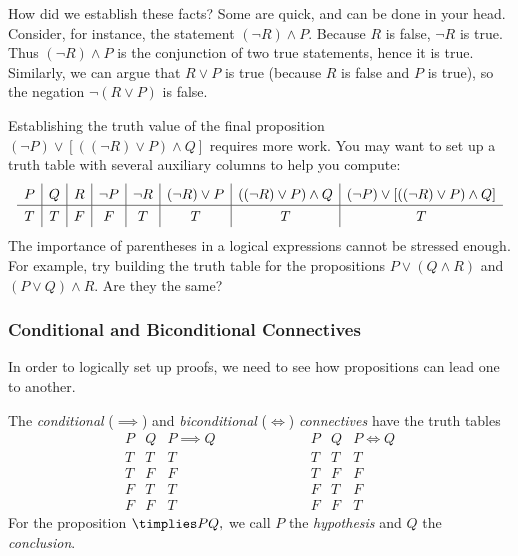\noindent How did we establish these facts? Some  are quick,  and can be done in your head. Consider, for instance, the statement  $(\neg R)\wedge P$. Because $R$ is false, $\neg R$ is true. Thus $(\neg R)\wedge P$ is the conjunction of two true statements, hence it is true. Similarly, we can argue that $R\vee P$ is true (because $R$ is false and $P$ is true), so the negation $\neg(R\vee P)$ is false.

\noindent  Establishing the truth value of the final proposition $(\neg P)\vee [((\neg R)\vee P) \wedge Q]$ requires more work. You may want to set up a truth table with several auxiliary columns to help you compute: 
\[\def\arraystretch{1.3}
\begin{array}{c|c|c|c|c|c|c|c}
P & Q & R & \neg P & \neg R & (\neg R) \vee P & ((\neg R)\vee P) \wedge Q &  (\neg P) \vee [ ((\neg R)\vee P) \wedge Q] \\\hline
 T & T & F & F            & T         & T                        & T                                               & T
 \end{array}\]
The importance of parentheses in a logical expressions cannot be stressed enough. For example, try building the truth table for the propositions $P\vee(Q\wedge R)$ and $(P\vee Q)\wedge R$. Are they the same?\pagebreak[4]


\subsubsection*{Conditional and Biconditional Connectives}

In order to logically set up proofs, we need to see how propositions can lead one to another.

\begin{defn}\label{defn:implies}
The \emph{conditional} ($\implies$) and \emph{biconditional} ($\iff$) \emph{connectives} have the truth tables
\[\begin{array}{cc|c}
P & Q & P\implies Q\\\hline
T & T & T\\
T & F & F\\
F & T & T\\
F & F & T
\end{array}\qquad\qquad\qquad
\begin{array}{cc|c}
P & Q & P\iff Q\\\hline
T & T & T\\
T & F & F\\
F & T & F\\
F & F & T
\end{array}\]
For the proposition $\timplies P{Q,}$ we call $P$ the \emph{hypothesis} and $Q$ the \emph{conclusion}.
\end{defn}

